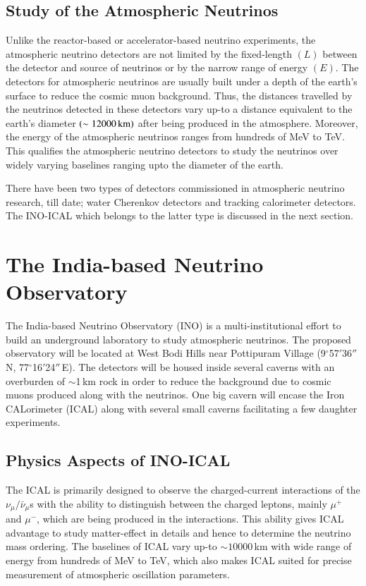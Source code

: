 \subsection{Study of the Atmospheric Neutrinos}
Unlike the reactor-based or accelerator-based neutrino experiments,
the atmospheric neutrino detectors are not limited by the fixed-length
$\left(L\right)$ between the detector and source of neutrinos or by
the narrow range of energy $\left(E\right)$. The detectors for
atmospheric neutrinos are usually built under a depth of the earth's
surface to reduce the cosmic muon background. Thus, the distances
travelled by the neutrinos detected in these detectors vary up-to a
distance equivalent to the earth's diameter
$\left(\sim 12000\text{\,km}\right)$ after being produced in the
atmosphere. Moreover, the energy of the atmospheric neutrinos ranges
from hundreds of MeV to TeV. This qualifies the atmospheric neutrino
detectors to study the neutrinos over widely varying baselines ranging
upto the diameter of the earth.

There have been two types of detectors commissioned in atmospheric
neutrino research, till date; water Cherenkov detectors and tracking
calorimeter detectors. The INO-ICAL which belongs to the latter type
is discussed in the next section.

\section{The India-based Neutrino Observatory}
The India-based Neutrino Observatory (INO)\cite{inowhite,inoreport}
is a multi-institutional effort to build an underground laboratory to
study atmospheric neutrinos. The proposed observatory will be located
at West Bodi Hills near Pottipuram Village (9$^\circ$57$'$36$''$\,N,
77$^\circ$16$'$24$''$\,E). The detectors will be housed inside several
caverns with an overburden of $\sim$1\,km rock in order to reduce the
background due to cosmic muons produced along with the neutrinos. One
big cavern will encase the Iron CALorimeter (ICAL) along with several
small caverns facilitating a few daughter experiments.

\subsection{Physics Aspects of INO-ICAL}
The ICAL is primarily designed to observe the charged-current
interactions of the $\nu_{\mu}/\bar{\nu}_{\mu}$s with the ability to
distinguish between the charged leptons, mainly $\mu^{+}$ and $\mu^{-}$,
which are being produced in the interactions. This ability gives ICAL
advantage to study matter-effect in details and hence to determine the
neutrino mass ordering. The baselines of ICAL vary up-to
$\sim 10000$\,km with wide range of energy from hundreds of MeV to
TeV, which also makes ICAL suited for precise measurement of
atmospheric oscillation parameters.

